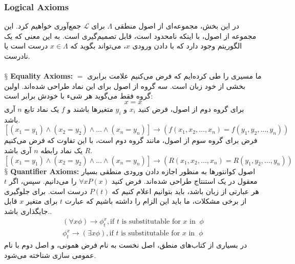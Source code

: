 \documentclass[10pt,a4paper]{article}
\newcommand{\newpoint}[1]{\indent$\mathsection$ \textbf{#1}}
\newcommand{\curveL}{\mathcal{L}}
\begin{document}
                        \subsubsection{Logical Axioms} 
در این بخش، مجموعه‌ای از اصول منطقی $\Lambda$ برای $\curveL$ جمع‌آوری خواهیم کرد. این مجموعه از اصول، با اینکه نامحدود است، قابل تصمیم‌گیری است. به این معنی که یک الگوریتم وجود دارد که با دادن ورودی $x$، می‌تواند بگوید که $x\in\Lambda$ درست است یا نادرست.
                            \\
                            \\
                            \newpoint{Equality Axioms:} ما مسیری را طی کرده‌ایم که فرض می‌کنیم علامت برابری $=$ بخشی از خود زبان است. سه گروه از اصول برای این نماد طراحی شده‌اند. اولین گروه فقط می‌گوید هر شیء با خودش برابر است:
                            \begin{equation}
                                x = x
                            \end{equation}  
برای گروه دوم از اصول، فرض کنید $x_i$ و $y_i$ متغیرها باشند و $f$ یک نماد تابع $n$ آری باشد.
                            \begin{equation}
                                \left[(x_1 = y_1)\land (x_2 = y_2) \land\dots\land(x_n = y_n) \right] \rightarrow \left(f(x_1,x_2,\dots,x_n) = f(y_1,y_2,\dots,y_n)\right)
                            \end{equation}
فرض برای گروه سوم از اصول، مانند گروه دوم است، با این تفاوت که فرض می‌کنیم $R$ یک نماد رابطه $n$ آری باشد.
                            \begin{equation}
                                \left[(x_1 = y_1)\land (x_2 = y_2) \land\dots\land(x_n = y_n) \right] \rightarrow \left(R(x_1,x_2,\dots,x_n) = R(y_1,y_2,\dots,y_n)\right)
                            \end{equation}
                            \newpoint{Quantifier Axioms:} اصول کوانتورها به منظور اجازه دادن ورودی منطقی بسیار معقول در یک استنتاج طراحی شده‌اند. فرض کنید $\forall xP(x)$ را می‌دانیم. سپس، اگر $t$ هر عبارتی از زبان باشد، باید بتوانیم اعلام کنیم که $P(t)$ درست است. برای جلوگیری از برخی مشکلات، ما باید این الزام را داشته باشیم که عبارت $t$ برای متغیر $x$ قابل جایگذاری باشد..
                            \begin{align}
                                (\forall x\phi)\rightarrow \phi_t^x, \text{if } t \text{ is substitutable for } x \text{ in } \ \phi \\
                                \phi_t^x\rightarrow (\exists x\phi), \text{if } t \text{ is substitutable for } x \text{ in } \ \phi
                            \end{align}
در بسیاری از کتاب‌های منطق، اصل نخست به نام فرض همونی، و اصل دوم با نام عمومی سازی شناخته می‌شود.
\end{document}
